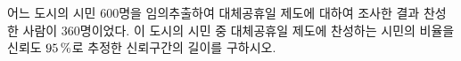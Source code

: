 어느 도시의 시민 $600$명을 임의추출하여 대체공휴일 제도에 대하여 조사한 결과 찬성한 사람이 $360$명이었다. 이 도시의 시민 중 대체공휴일 제도에 찬성하는 시민의 비율을 신뢰도 $95\mkern3mu \%$로 추정한 신뢰구간의 길이를 구하시오. 
